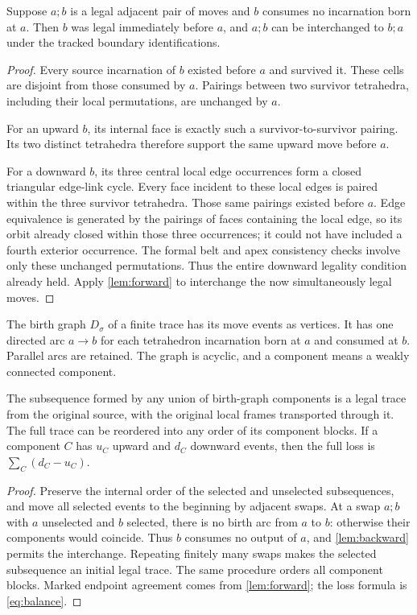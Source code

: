 \begin{lemma}\label{lem:backward}
Suppose $a;b$ is a legal adjacent pair of moves and $b$ consumes no
incarnation born at $a$. Then $b$ was legal immediately before $a$, and
$a;b$ can be interchanged to $b;a$ under the tracked boundary identifications.
\end{lemma}
\begin{proof}
Every source incarnation of $b$ existed before $a$ and survived it. These
cells are disjoint from those consumed by $a$. Pairings between two survivor
tetrahedra, including their local permutations, are unchanged by $a$.

For an upward $b$, its internal face is exactly such a survivor-to-survivor
pairing. Its two distinct tetrahedra therefore support the same upward move
before $a$.

For a downward $b$, its three central local edge occurrences form a closed
triangular edge-link cycle. Every face incident to these local edges is
paired within the three survivor tetrahedra. Those same pairings existed
before $a$. Edge equivalence is generated by the pairings of faces containing
the local edge, so its orbit already closed within those three occurrences;
it could not have included a fourth exterior occurrence. The formal belt
and apex consistency checks involve only these unchanged permutations.
Thus the entire downward legality condition already held. Apply
\cref{lem:forward} to interchange the now simultaneously legal moves.
\end{proof}

\begin{definition}
The birth graph $D_\sigma$ of a finite trace has its move events as vertices.
It has one directed arc $a\to b$ for each tetrahedron incarnation born at
$a$ and consumed at $b$. Parallel arcs are retained. The graph is acyclic,
and a component means a weakly connected component.
\end{definition}

\begin{theorem}\label{thm:projection}
The subsequence formed by any union of birth-graph components is a legal
trace from the original source, with the original local frames transported
through it. The full trace can be reordered into any order of its component
blocks. If a component $C$ has $u_C$ upward and $d_C$ downward events, then
the full loss is $\sum_C(d_C-u_C)$.
\end{theorem}
\begin{proof}
Preserve the internal order of the selected and unselected subsequences,
and move all selected events to the beginning by adjacent swaps. At a swap
$a;b$ with $a$ unselected and $b$ selected, there is no birth arc from $a$
to $b$: otherwise their components would coincide. Thus $b$ consumes no
output of $a$, and \cref{lem:backward} permits the interchange. Repeating
finitely many swaps makes the selected subsequence an initial legal trace.
The same procedure orders all component blocks. Marked endpoint agreement
comes from \cref{lem:forward}; the loss formula is \eqref{eq:balance}.
\end{proof}


